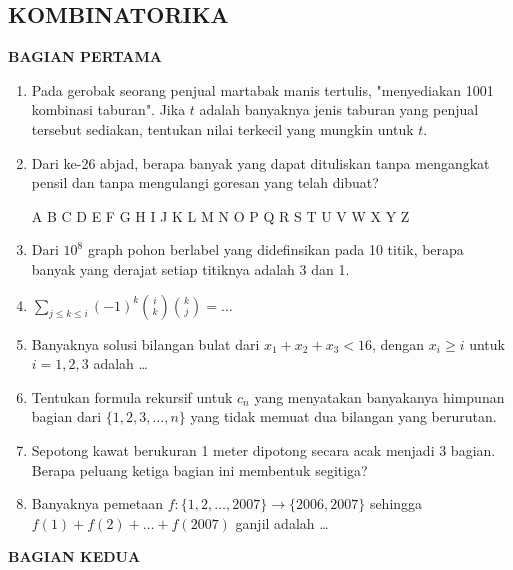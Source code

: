 \documentclass[12pt,twoside]{article}
\begin{document}
\newpage
\newpage \subsection{KOMBINATORIKA}
\textbf{BAGIAN PERTAMA}
\begin{enumerate}
	\item Pada gerobak seorang penjual martabak manis tertulis, "menyediakan 1001 kombinasi taburan". Jika $t$ adalah banyaknya jenis taburan yang penjual tersebut sediakan, tentukan nilai terkecil yang mungkin untuk $t$.
	\item Dari ke-26 abjad, berapa banyak yang dapat dituliskan tanpa mengangkat pensil dan tanpa mengulangi goresan yang telah dibuat?
	      \begin{center}
		      A B C D E F G H I J K L M N O P Q R S T U V W X Y Z
	      \end{center}
	\item Dari $10^8$ graph pohon berlabel yang didefinsikan pada 10 titik, berapa banyak yang derajat setiap titiknya adalah 3 dan 1.
	\item $\displaystyle \sum_{j\leq k\leq i}(-1)^k\binom{i}{k}\binom{k}{j}=\dots$
	\item Banyaknya solusi bilangan bulat dari $x_1+x_2+x_3<16$, dengan $x_i\geq i$ untuk $i=1,2,3$ adalah \dots
	\item Tentukan formula rekursif untuk $c_n$ yang menyatakan banyakanya himpunan bagian dari $\{1,2,3,\dots,n\}$ yang tidak memuat dua bilangan yang berurutan.
	\item Sepotong kawat berukuran 1 meter dipotong secara acak menjadi 3 bagian. Berapa peluang ketiga bagian ini membentuk segitiga?
	\item Banyaknya pemetaan $f:\{ 1,2,\dots,2007\}\to \{2006,2007 \}$ sehingga $f(1)+f(2)+\dots+f(2007)$ ganjil adalah \dots

\end{enumerate}
\newpage
\newpage \textbf{BAGIAN KEDUA}
\end{document}
